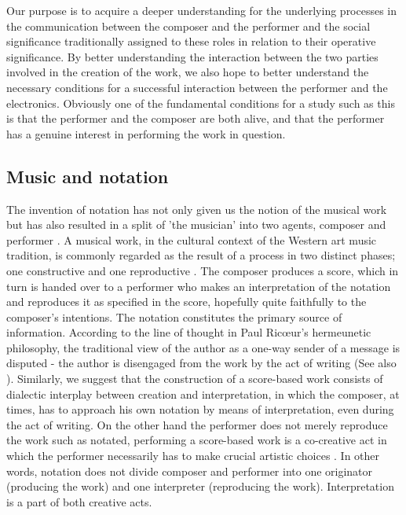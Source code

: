 \documentclass[10pt,letterpaper]{article}
\begin{document}
Our purpose is to acquire a deeper understanding for the underlying
processes in the communication between the composer and the performer
and the social significance traditionally assigned to these roles in
relation to their operative significance. By better understanding the
interaction between the two parties involved in the creation of the
work, we also hope to better understand the necessary conditions for a
successful interaction between the performer and the electronics.
Obviously one of the fundamental conditions for a study such as this is
that the performer and the composer are both alive, and that the
performer has a genuine interest in performing the work in question.

\subsection{Music and notation} \label{twoagents}
The invention of notation has not only given us the notion of the
musical work but has also resulted in a split of 'the musician' into two
agents, composer and performer \cite{wis96}. A musical work, in the cultural context
of the Western art music tradition, is commonly regarded as the result
of a process in two distinct phases; one constructive and one
reproductive \cite{nattiez}. The composer produces a score, which in turn is handed
over to a performer who makes an interpretation of the notation and
reproduces it as specified in the score, hopefully quite faithfully to
the composer's intentions. The notation constitutes the primary source
of information. According to the line of thought in Paul Ric{\oe}ur's
hermeunetic philosophy, the traditional view of the author as a one-way
sender of a message is disputed - the author is disengaged from the work
by the act of writing \cite{ric91} (See also \cite{barthesMus}\nocite{barthes1}). Similarly, we suggest that the construction
of a score-based work consists of dialectic interplay between creation
and interpretation, in which the composer, at times, has to approach his
own notation by means of interpretation, even during the act of
writing. On the other hand the performer does not merely reproduce the
work such as notated, performing a score-based work is a co-creative act
in which the performer necessarily has to make crucial artistic
choices \cite{kivy,davies}. In other words, notation does not divide composer and performer
into one originator (producing the work) and one interpreter
(reproducing the work). Interpretation is a part of both creative acts.
\end{document}
